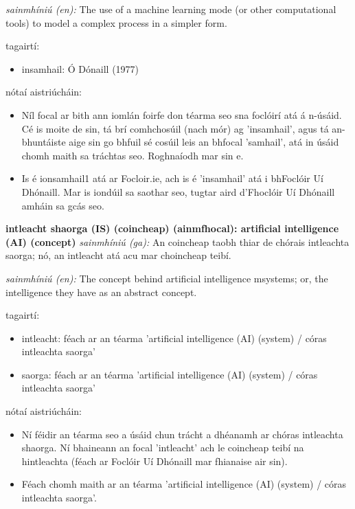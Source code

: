 \documentclass{article}
\begin{document}
\textit{sainmhíniú (en):} The use of a machine learning mode (or other computational tools) to model a complex process in a simpler form.

tagairtí:
\begin{itemize}
	\item insamhail: Ó Dónaill (1977) \cite{odonaill}
\end{itemize}

nótaí aistriúcháin:
\begin{itemize}
	\item Níl focal ar bith ann iomlán foirfe don téarma seo sna foclóirí atá á n-úsáid. Cé is moite de sin, tá brí comhchosúil (nach mór) ag 'insamhail', agus tá an-bhuntáiste aige sin go bhfuil sé cosúil leis an bhfocal 'samhail', atá in úsáid chomh maith sa tráchtas seo. Roghnaíodh mar sin e.
	\item Is é ionsamhail1 atá ar Focloir.ie, ach is é 'insamhail' atá i bhFoclóir Uí Dhónaill. Mar is iondúil sa saothar seo, tugtar aird d'Fhoclóir Uí Dhónaill amháin sa gcás seo.
\end{itemize}


\textbf{intleacht shaorga (IS) (coincheap) (ainmfhocal): artificial intelligence (AI) (concept)}
\textit{sainmhíniú (ga):} An coincheap taobh thiar de chórais intleachta saorga; nó, an intleacht atá acu mar choincheap teibí.

\textit{sainmhíniú (en):} The concept behind artificial intelligence msystems; or, the intelligence they have as an abstract concept.

tagairtí:
\begin{itemize}
	\item intleacht: féach ar an téarma 'artificial intelligence (AI) (system) / córas intleachta saorga'
	\item saorga: féach ar an téarma 'artificial intelligence (AI) (system) / córas intleachta saorga'
\end{itemize}

nótaí aistriúcháin:
\begin{itemize}
	\item Ní féidir an téarma seo a úsáid chun trácht a dhéanamh ar chóras intleachta shaorga. Ní bhaineann an focal 'intleacht' ach le coincheap teibí na hintleachta (féach ar Foclóir Uí Dhónaill mar fhianaise air sin).
	\item Féach chomh maith ar an téarma 'artificial intelligence (AI) (system) / córas intleachta saorga'.
\end{itemize}
\end{document}
